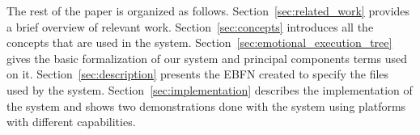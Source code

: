 The rest of the paper is organized as follows. Section~\ref{sec:related_work} provides a brief overview of relevant work. Section~\ref{sec:concepts} introduces all the concepts that are used in the system. Section~\ref{sec:emotional_execution_tree} gives the basic formalization of our system and principal components terms used on it. Section~\ref{sec:description} presents the EBFN created to specify the files used by the system. Section~\ref{sec:implementation} describes the implementation of the system and shows two demonstrations done with the system using platforms with different capabilities.
